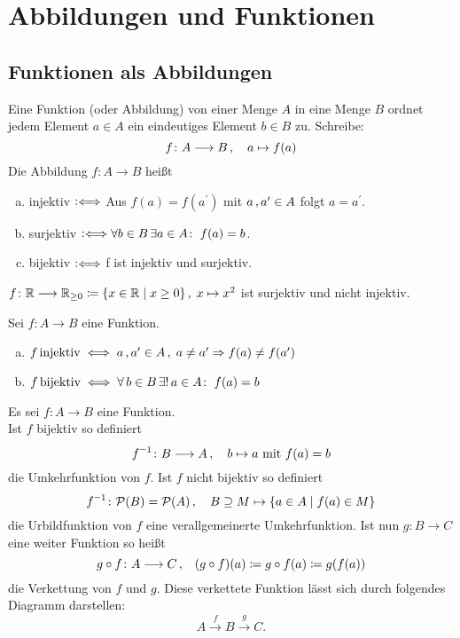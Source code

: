 \documentclass[../ana1.tex]{subfiles}
\begin{document}
\setcounter{section}{3}

\section{Abbildungen und Funktionen}

\subsection{Funktionen als Abbildungen}

\begin{defi}
	Eine Funktion (oder Abbildung) von einer Menge \(A \) in eine Menge \(B \) ordnet jedem Element \(a \in A \)
	ein eindeutiges Element \(b \in B \) zu. Schreibe:
	\[f \colon A \longrightarrow B \operatorname{,} \quad a \mapsto f(a) \]
	Die Abbildung \(f \colon A \longrightarrow B \) heißt
	\begin{enumerate}[(a)]
		\item injektiv \(\mathrel{\vcentcolon\Longleftrightarrow} \) Aus \(f(a) = f(a^\prime) \) mit \(a \operatorname{,} a^\prime \in A \) folgt \(a = a^\prime \).
		\item surjektiv \(\mathrel{\vcentcolon\Longleftrightarrow} \forall b \in B \, \exists a \in A \colon \; f(a) = b \).
		\item bijektiv \(\mathrel{\vcentcolon\Longleftrightarrow} \) f ist injektiv und surjektiv. 
	\end{enumerate}
\end{defi}

\begin{bsp}
	\(f \colon \mathbb{R} \longrightarrow \mathbb{R}_{\geq 0} \coloneqq \{x \in \mathbb{R} \; \vert \; x \geq 0\} \operatorname{,} \; x \mapsto x^{2} \) ist surjektiv und nicht injektiv.
\end{bsp}

\begin{bem}
	Sei \(f \colon A \longrightarrow B \) eine Funktion.
	\begin{enumerate}[(a)]
		\item \(f \operatorname{injektiv} \iff a \operatorname{,} a^\prime \in A \operatorname{,} \; a \neq a^\prime \Rightarrow f(a) \neq f(a^\prime) \)
		\item \(f \operatorname{bijektiv} \iff \forall \, b \in B \, \exists! \,a \in A \colon \; f(a) = b \)
	\end{enumerate}
\end{bem}

\begin{defi*}
	Es sei \(f \colon A \longrightarrow B \) eine Funktion. \\
	Ist \(f \) bijektiv so definiert
	\[\inverse{f} \colon B \longrightarrow A \ko \quad b \mapsto a \text{ mit } f(a) = b \]
	die Umkehrfunktion von \(f \).
	Ist \(f \) nicht bijektiv so definiert
	\[\inverse{f} \colon \PO(B) = \PO(A) \ko \quad B \supseteq M \mapsto \set{a \in A \; \vert \; f(a) \in M} \]
	die Urbildfunktion von \(f \) eine verallgemeinerte Umkehrfunktion.
	Ist nun \(g \colon B \longrightarrow C \) eine weiter Funktion so heißt
	\[g \circ f \colon A \longrightarrow C \operatorname{,} \quad (g \circ f)(a) \coloneqq g \circ f(a) \coloneqq g(f(a)) \]
	die Verkettung von \(f \) und \(g \). Diese verkettete Funktion lässt sich durch folgendes Diagramm darstellen:
	\[A \overset{f}{\longrightarrow} B \overset{g}{\longrightarrow} C. \]
\end{defi*}
\end{document}
